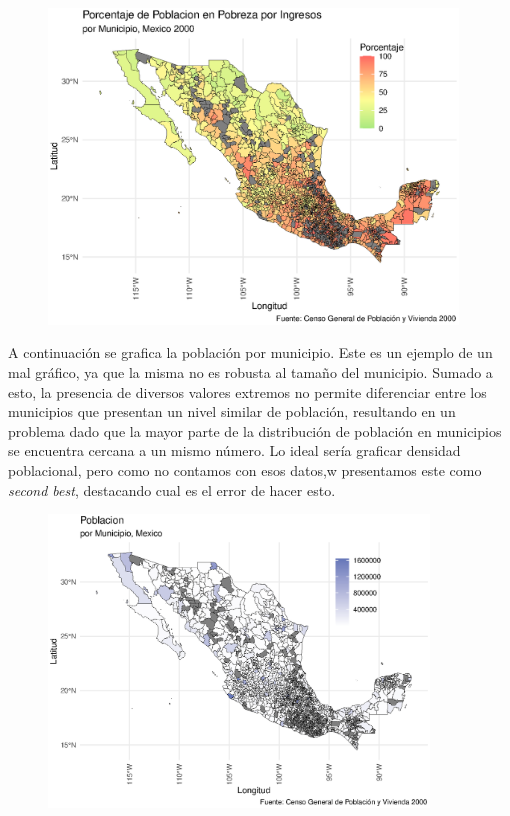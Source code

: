 \documentclass[9pt]{article}
\begin{document}
  \begin{figure}[H]
     \centering
     \includegraphics[width=0.97\textwidth]{figs/povertypat.eps}
 \end{figure}
 A continuaci\'on se grafica la poblaci\'on por municipio. Este es un ejemplo de un mal gr\'afico, ya que la misma no es robusta al tama\~no del municipio. Sumado a esto, la presencia de diversos valores extremos no permite diferenciar entre los municipios que presentan un nivel similar de poblaci\'on, resultando en un problema dado que la mayor parte de la distribuci\'on de poblaci\'on en municipios se encuentra cercana a un mismo n\'umero. Lo ideal ser\'ia graficar densidad poblacional, pero como no contamos con esos datos,w presentamos este como \textit{second best}, destacando cual es el error de hacer esto.  
   \begin{figure}[H]
     \centering
     \includegraphics[width=0.9\textwidth]{figs/populationb.eps}
 \end{figure}
\end{document}
